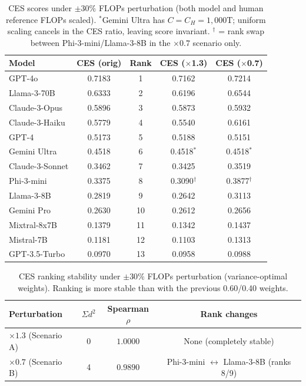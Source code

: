 \documentclass[12pt]{article}
\begin{document}
\begin{table}[H]
\centering
\begin{tabular}{lcccc}
\toprule
\textbf{Model} & \textbf{CES (orig)} & \textbf{Rank} & \textbf{CES ($\times$1.3)} & \textbf{CES ($\times$0.7)} \\
\midrule
GPT-4o          & 0.7183 &  1 & 0.7162 & 0.7214 \\
Llama-3-70B     & 0.6333 &  2 & 0.6196 & 0.6544 \\
Claude-3-Opus   & 0.5896 &  3 & 0.5873 & 0.5932 \\
Claude-3-Haiku  & 0.5779 &  4 & 0.5540 & 0.6161 \\
GPT-4           & 0.5173 &  5 & 0.5188 & 0.5151 \\
Gemini Ultra    & 0.4518 &  6 & 0.4518$^*$ & 0.4518$^*$ \\
Claude-3-Sonnet & 0.3462 &  7 & 0.3425 & 0.3519 \\
Phi-3-mini      & 0.3375 &  8 & 0.3090$^\dagger$ & 0.3877$^\dagger$ \\
Llama-3-8B      & 0.2819 &  9 & 0.2642 & 0.3113 \\
Gemini Pro      & 0.2630 & 10 & 0.2612 & 0.2656 \\
Mixtral-8x7B    & 0.1379 & 11 & 0.1342 & 0.1437 \\
Mistral-7B      & 0.1181 & 12 & 0.1103 & 0.1313 \\
GPT-3.5-Turbo   & 0.0970 & 13 & 0.0958 & 0.0988 \\
\bottomrule
\end{tabular}
\caption{CES scores under $\pm30\%$ FLOPs perturbation (both model and human reference FLOPs scaled). $^*$Gemini Ultra has $C=C_H=1{,}000$T; uniform scaling cancels in the CES ratio, leaving score invariant. $^\dagger$ = rank swap between Phi-3-mini/Llama-3-8B in the $\times0.7$ scenario only.}
\end{table}

\begin{table}[H]
\centering
\begin{tabular}{lccc}
\toprule
\textbf{Perturbation} & $\Sigma d^2$ & \textbf{Spearman} $\rho$ & \textbf{Rank changes} \\
\midrule
$\times 1.3$ (Scenario A) & 0 & $1.0000$ & None (completely stable) \\
$\times 0.7$ (Scenario B) & 4 & $0.9890$ & Phi-3-mini $\leftrightarrow$ Llama-3-8B (ranks 8/9) \\
\bottomrule
\end{tabular}
\caption{CES ranking stability under $\pm30\%$ FLOPs perturbation (variance-optimal weights). Ranking is more stable than with the previous 0.60/0.40 weights.}
\end{table}
\end{document}
